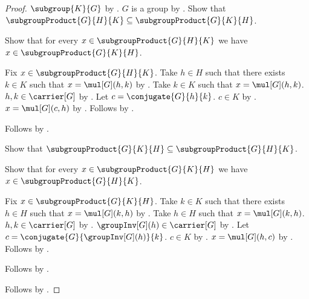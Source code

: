 \begin{proof}
    $\subgroup{K}{G}$ by .
    $G$ is a group by .
    Show that $\subgroupProduct{G}{H}{K}\subseteq
        \subgroupProduct{G}{K}{H}$.
    \begin{subproof}
        Show that for every $x\in\subgroupProduct{G}{H}{K}$ we have
            $x\in\subgroupProduct{G}{K}{H}$.
        \begin{subproof}
            Fix $x\in\subgroupProduct{G}{H}{K}$.
            Take $h\in H$ such that there exists $k\in K$ such that
                $x=\mul[G](h,k)$ by
                .
            Take $k\in K$ such that $x=\mul[G](h,k)$.
            $h,k\in\carrier[G]$ by
                .
            Let $c=\conjugate{G}{h}{k}$.
            $c\in K$ by
                .
            $x=\mul[G](c,h)$ by
                .
            Follows by .
        \end{subproof}
        Follows by .
    \end{subproof}
    Show that $\subgroupProduct{G}{K}{H}\subseteq
        \subgroupProduct{G}{H}{K}$.
    \begin{subproof}
        Show that for every $x\in\subgroupProduct{G}{K}{H}$ we have
            $x\in\subgroupProduct{G}{H}{K}$.
        \begin{subproof}
            Fix $x\in\subgroupProduct{G}{K}{H}$.
            Take $k\in K$ such that there exists $h\in H$ such that
                $x=\mul[G](k,h)$ by
                .
            Take $h\in H$ such that $x=\mul[G](k,h)$.
            $h,k\in\carrier[G]$ by
                .
            $\groupInv[G](h)\in\carrier[G]$ by
                .
            Let $c=\conjugate{G}{\groupInv[G](h)}{k}$.
            $c\in K$ by
                .
            $x=\mul[G](h,c)$ by
                .
            Follows by .
        \end{subproof}
        Follows by .
    \end{subproof}
    Follows by .
\end{proof}

